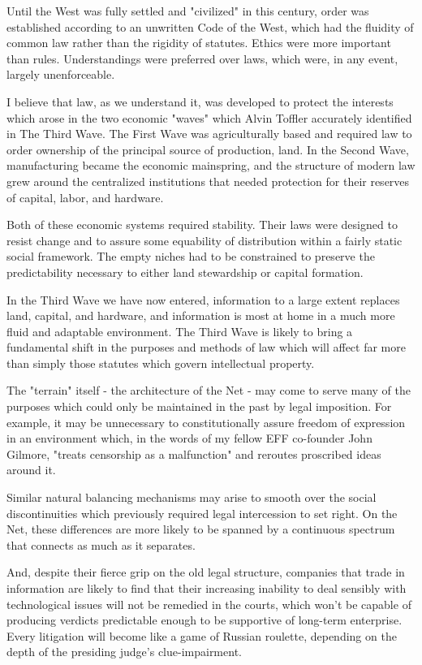 \documentclass[
]{article}
\begin{document}
Until the West was fully settled and "civilized" in this century, order
was established according to an unwritten Code of the West, which had
the fluidity of common law rather than the rigidity of statutes. Ethics
were more important than rules. Understandings were preferred over laws,
which were, in any event, largely unenforceable.

I believe that law, as we understand it, was developed to protect the
interests which arose in the two economic "waves" which Alvin Toffler
accurately identified in The Third Wave. The First Wave was
agriculturally based and required law to order ownership of the
principal source of production, land. In the Second Wave, manufacturing
became the economic mainspring, and the structure of modern law grew
around the centralized institutions that needed protection for their
reserves of capital, labor, and hardware.

Both of these economic systems required stability. Their laws were
designed to resist change and to assure some equability of distribution
within a fairly static social framework. The empty niches had to be
constrained to preserve the predictability necessary to either land
stewardship or capital formation.

In the Third Wave we have now entered, information to a large extent
replaces land, capital, and hardware, and information is most at home in
a much more fluid and adaptable environment. The Third Wave is likely to
bring a fundamental shift in the purposes and methods of law which will
affect far more than simply those statutes which govern intellectual
property.

The "terrain" itself - the architecture of the Net - may come to serve
many of the purposes which could only be maintained in the past by legal
imposition. For example, it may be unnecessary to constitutionally
assure freedom of expression in an environment which, in the words of my
fellow EFF co-founder John Gilmore, "treats censorship as a malfunction"
and reroutes proscribed ideas around it.

Similar natural balancing mechanisms may arise to smooth over the social
discontinuities which previously required legal intercession to set
right. On the Net, these differences are more likely to be spanned by a
continuous spectrum that connects as much as it separates.

And, despite their fierce grip on the old legal structure, companies
that trade in information are likely to find that their increasing
inability to deal sensibly with technological issues will not be
remedied in the courts, which won't be capable of producing verdicts
predictable enough to be supportive of long-term enterprise. Every
litigation will become like a game of Russian roulette, depending on the
depth of the presiding judge's clue-impairment.
\end{document}
